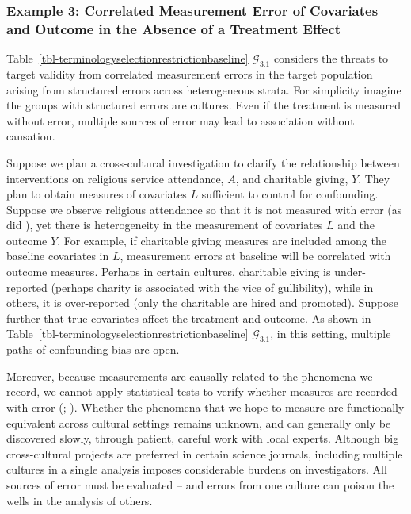 \documentclass[
  single column]{article}
\begin{document}
\subsubsection{Example 3: Correlated Measurement Error of Covariates and
Outcome in the Absence of a Treatment
Effect}\label{example-3-correlated-measurement-error-of-covariates-and-outcome-in-the-absence-of-a-treatment-effect}

Table~\ref{tbl-terminologyselectionrestrictionbaseline}
\(\mathcal{G}_{3.1}\) considers the threats to target validity from
correlated measurement errors in the target population arising from
structured errors across heterogeneous strata. For simplicity imagine
the groups with structured errors are cultures. Even if the treatment is
measured without error, multiple sources of error may lead to
association without causation.

Suppose we plan a cross-cultural investigation to clarify the
relationship between interventions on religious service attendance,
\(A\), and charitable giving, \(Y\). They plan to obtain measures of
covariates \(L\) sufficient to control for confounding. Suppose we
observe religious attendance so that it is not measured with error (as
did ), yet
there is heterogeneity in the measurement of covariates \(L\) and the
outcome \(Y\). For example, if charitable giving measures are included
among the baseline covariates in \(L\), measurement errors at baseline
will be correlated with outcome measures. Perhaps in certain cultures,
charitable giving is under-reported (perhaps charity is associated with
the vice of gullibility), while in others, it is over-reported (only the
charitable are hired and promoted). Suppose further that true covariates
affect the treatment and outcome. As shown in
Table~\ref{tbl-terminologyselectionrestrictionbaseline}
\(\mathcal{G}_{3.1}\), in this setting, multiple paths of confounding
bias are open.

Moreover, because measurements are causally related to the phenomena we
record, we cannot apply statistical tests to verify whether measures are
recorded with error (;
). Whether
the phenomena that we hope to measure are functionally equivalent across
cultural settings remains unknown, and can generally only be discovered
slowly, through patient, careful work with local experts. Although big
cross-cultural projects are preferred in certain science journals,
including multiple cultures in a single analysis imposes considerable
burdens on investigators. All sources of error must be evaluated -- and
errors from one culture can poison the wells in the analysis of others.
\end{document}
